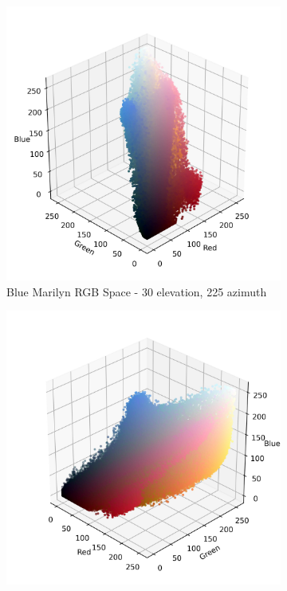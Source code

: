 \documentclass{article}
\begin{document}
\begin{figure}[ht]\ContinuedFloat
  \centering
  \begin{subfigure}{0.45\textwidth}
    \includegraphics[width=\textwidth]{main_files/figure-latex/4_15_blue_marilyn_original_scatter.jpg}
    \caption{Blue Marilyn RGB Space - 30 \degree elevation, 225 \degree azimuth}
    \label{fig:4_15_blue_marilyn_original_scatter}
  \end{subfigure}
  \hfill
  \begin{subfigure}{0.45\textwidth}
    \includegraphics[width=\textwidth]{main_files/figure-latex/4_16_blue_marilyn_original_scatter.jpg}

\end{subfigure}
\end{figure}
\end{document}
